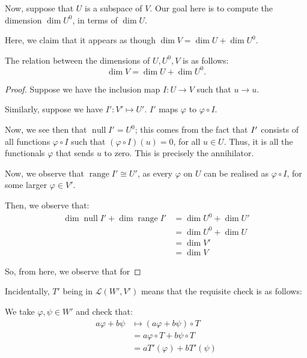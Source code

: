 \documentclass[openany]{book}
\DeclareMathOperator*{\vnull}{null}
\DeclareMathOperator*{\vrange}{range}
\begin{document}
\begin{example}
	Now, suppose that $U$ is a subspace of $V$. Our goal here is to compute the dimension $\dim U^{0}$, in terms of $\dim U$.
	
	Here, we claim that it appears as though $\dim V = \dim U + \dim U^{0}$.
\end{example}
\begin{thm}
	The relation between the dimensions of $U, U^{0}, V$ is as follows:
	\begin{equation*}
		\dim V = \dim U + \dim U^{0}.
	\end{equation*}
\end{thm}
\begin{proof}
	Suppose we have the inclusion map $I : U \rightarrow V$ such that $u \rightarrow u$.
	
	Similarly, suppose we have $I' : V' \mapsto U'$. $I'$ maps $\varphi$ to $\varphi \circ I$.
	
	Now, we see then that $\vnull I' = U^{0}$; this comes from the fact that $\null I'$ consists of all functions $\varphi \circ I$ such that $(\varphi \circ I )(u)= 0$, for all $u \in U$. Thus, it is all the functionals $\varphi$ that sends $u$ to zero. This is precisely the annihilator.
	
	Now, we observe that $\vrange I' \cong U'$, as every $\varphi$ on $U$ can be realised as $\varphi \circ I$, for some larger $\varphi \in V'$.
	
	Then, we observe that:
	\begin{align*}
		\dim \vnull I' + \dim \vrange I' &= \dim U^{0} + \dim U' \\
		&= \dim U^{0} + \dim U \\
		&= \dim V' \\
		&= \dim V
 	\end{align*} 
 
 	So, from here, we observe that for 
	
	
\end{proof}


\begin{rmk}
		Incidentally, $T'$ being in $\mathcal L(W', V')$ means that the requisite check is as follows:
	
	We take $\varphi, \psi \in W'$ and check that:
	\begin{align*}
		a\varphi + b \psi &\mapsto (a\varphi + b \psi) \circ T \\
		&= a\varphi \circ T + b \psi \circ T \\
		&= a T'(\varphi) + b T'(\psi)
	\end{align*}
\end{rmk}
\end{document}
